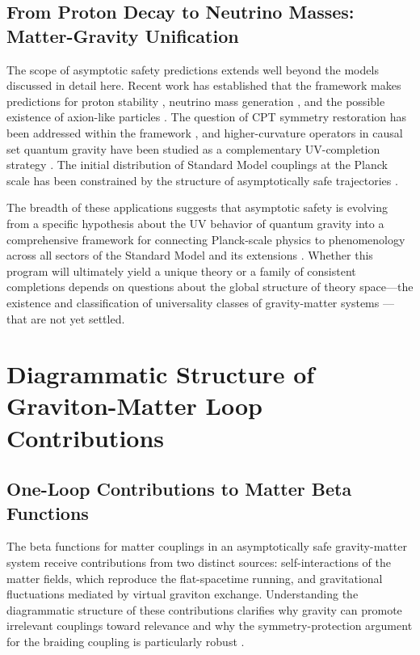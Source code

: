 \documentclass[12pt,a4paper]{article}
\begin{document}
\subsection{From Proton Decay to Neutrino Masses: Matter-Gravity Unification}

The scope of asymptotic safety predictions extends well beyond the models
discussed in detail here. Recent work has established that the framework makes
predictions for proton stability \cite{EichhornRay2024}, neutrino mass
generation \cite{deBritoEichhornPereiraYamada2025}, and the possible existence
of axion-like particles \cite{deBritoEichhornLino2022}. The question of CPT
symmetry restoration has been addressed within the framework
\cite{EichhornSchifferCPT2025}, and higher-curvature operators in causal set
quantum gravity have been studied as a complementary UV-completion strategy
\cite{deBritoEichhornPfeiffer2023b}. The initial distribution of Standard Model
couplings at the Planck scale has been constrained by the structure of
asymptotically safe trajectories \cite{EichhornHeld2025}.

The breadth of these applications suggests that asymptotic safety is evolving
from a specific hypothesis about the UV behavior of quantum gravity into a
comprehensive framework for connecting Planck-scale physics to phenomenology
across all sectors of the Standard Model and its extensions
\cite{BuoninfanteEtal2025,Eichhorn2022status}. Whether this program will
ultimately yield a unique theory or a family of consistent completions depends
on questions about the global structure of theory space---the existence and
classification of universality classes of gravity-matter systems
\cite{CastroEichhornGurau2026}---that are not yet settled.

\section{Diagrammatic Structure of Graviton-Matter Loop Contributions}

\subsection{One-Loop Contributions to Matter Beta Functions}

The beta functions for matter couplings in an asymptotically safe gravity-matter
system receive contributions from two distinct sources: self-interactions of the
matter fields, which reproduce the flat-spacetime running, and gravitational
fluctuations mediated by virtual graviton exchange. Understanding the
diagrammatic structure of these contributions clarifies why gravity can promote
irrelevant couplings toward relevance and why the symmetry-protection argument
for the braiding coupling is particularly robust \cite{Reuter1998,Berges2002,
Dupuis2021}.
\end{document}

